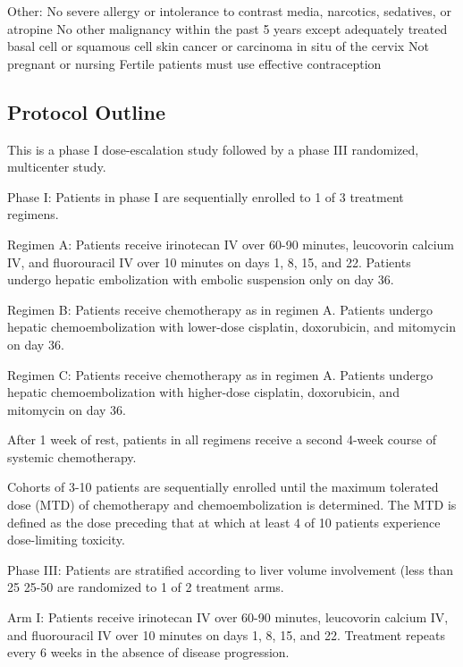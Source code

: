 \documentclass[12pt]{article}
\begin{document}
Other:
No severe allergy or intolerance to contrast media, narcotics, sedatives, or
atropine
No other malignancy within the past 5 years except adequately treated basal
cell or squamous cell skin cancer or carcinoma in situ of the cervix
Not pregnant or nursing
Fertile patients must use effective contraception

\subsection*{Protocol Outline}
This is a phase I dose-escalation study followed by a phase III randomized,
multicenter study.
                                     
Phase I:
Patients in phase I are sequentially enrolled to 1 of 3 treatment regimens.
                                     
Regimen A:  Patients receive irinotecan IV over 60-90 minutes, leucovorin
calcium IV, and fluorouracil IV over 10 minutes on days 1, 8, 15, and 22.
Patients undergo hepatic embolization with embolic suspension only on day 36.
                                     
Regimen B:  Patients receive chemotherapy as in regimen A.  Patients undergo
hepatic chemoembolization with lower-dose cisplatin, doxorubicin, and mitomycin
on day 36.
                                     
Regimen C:  Patients receive chemotherapy as in regimen A.  Patients undergo
hepatic chemoembolization with higher-dose cisplatin, doxorubicin, and mitomycin
on day 36.
                                     
After 1 week of rest, patients in all regimens receive a second 4-week course of
systemic chemotherapy.
                                     
Cohorts of 3-10 patients are sequentially enrolled until the maximum tolerated
dose (MTD) of chemotherapy and chemoembolization is determined.  The MTD is
defined as the dose preceding that at which at least 4 of 10 patients experience
dose-limiting toxicity.
                                     
Phase III:
Patients are stratified according to liver volume involvement (less than 25%
25-50%
are randomized to 1 of 2 treatment arms.
                                     
Arm I:  Patients receive irinotecan IV over 60-90 minutes, leucovorin calcium
IV, and fluorouracil IV over 10 minutes on days 1, 8, 15, and 22.  Treatment
repeats every 6 weeks in the absence of disease progression.
                                     
\end{document}
